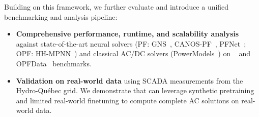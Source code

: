 Building on this framework, we further evaluate \genco and introduce a unified benchmarking and analysis pipeline:

\begin{itemize}
    \item \textbf{Comprehensive performance, runtime, and scalability analysis} against state-of-the-art neural solvers (PF: GNS~\cite{DONON2020106547}, CANOS-PF~\cite{NEURIPS2025_d000ef56}, PFNet~\cite{lin2024powerflownet}; OPF: HH-MPNN~\cite{arowolo2025}) and classical AC/DC solvers (PowerModels~\cite{powermodels}) on \pfdelta~\cite{NEURIPS2025_d000ef56} and OPFData~\cite{lovett2024opfdatalargescaledatasetsac} benchmarks. 
    \item \textbf{Validation on real-world data} using SCADA measurements from the Hydro-Québec grid. We demonstrate that \genco can leverage synthetic pretraining and limited real-world finetuning to compute complete AC solutions on real-world data.
\end{itemize}




